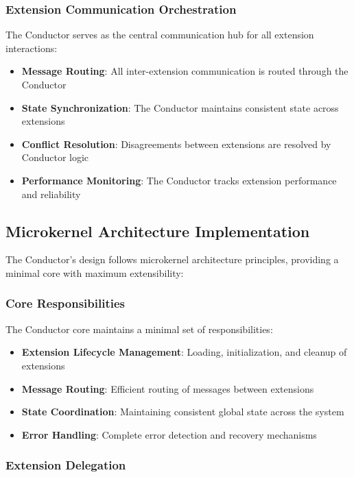 \subsubsection{Extension Communication Orchestration}

The Conductor serves as the central communication hub for all extension interactions:

\begin{itemize}
    \item \textbf{Message Routing}: All inter-extension communication is routed through the Conductor
    \item \textbf{State Synchronization}: The Conductor maintains consistent state across extensions
    \item \textbf{Conflict Resolution}: Disagreements between extensions are resolved by Conductor logic
    \item \textbf{Performance Monitoring}: The Conductor tracks extension performance and reliability
\end{itemize}

\subsection{Microkernel Architecture Implementation}

The Conductor's design follows microkernel architecture principles, providing a minimal core with maximum extensibility:

\subsubsection{Core Responsibilities}

The Conductor core maintains a minimal set of responsibilities:

\begin{itemize}
    \item \textbf{Extension Lifecycle Management}: Loading, initialization, and cleanup of extensions
    \item \textbf{Message Routing}: Efficient routing of messages between extensions
    \item \textbf{State Coordination}: Maintaining consistent global state across the system
    \item \textbf{Error Handling}: Complete error detection and recovery mechanisms
\end{itemize}

\subsubsection{Extension Delegation}

